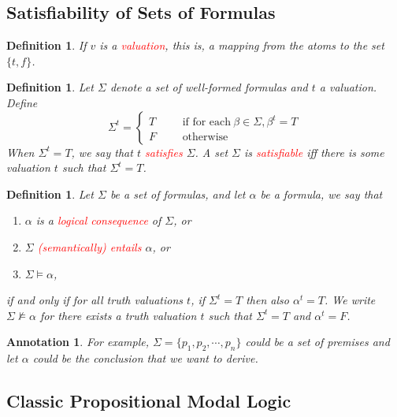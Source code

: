\documentclass{article}
\theoremstyle{plain}
\newtheorem{definition}[theorem]{Definition}
\newtheorem{annotation}[theorem]{Annotation}
\theoremstyle{nonumberplain}
\newcommand{\redt}[1]{\textcolor{red}{#1}}
\begin{document}
\newpage
\subsection{Satisfiability of Sets of Formulas}

\begin{definition}
\rm If $v$ is a \redt{valuation}, this is, a mapping from the atoms to the set $\{t,f\}$.   
\end{definition}


\begin{definition}
\rm \cite{cs245-sat} Let $\Sigma$ denote a set of well-formed formulas and $t$ a valuation. Define 
$$
\Sigma^t = \left\{
\begin{aligned}
T &&& \text{if for each}~\beta \in \Sigma, \beta^t = T \\
F &&& \text{otherwise}
\end{aligned}\right.
$$
When $\Sigma^t = T$, we say that $t$ \redt{satisfies} $\Sigma$. A set $\Sigma$ is \redt{satisfiable} iff there is some valuation $t$ such that $\Sigma^t = T$. 
\end{definition}


\begin{definition}
\rm Let $\Sigma$ be a set of formulas, and let $\alpha$ be a formula, we say that 
\begin{enumerate}
	\item $\alpha$ is a \redt{logical consequence} of $\Sigma$, or
	\item $\Sigma$ \redt{(semantically) entails} $\alpha$, or
	\item $\Sigma \models \alpha$,
\end{enumerate}
if and only if for all truth valuations $t$, if $\Sigma^t = T$ then also $\alpha^t = T$. We write $\Sigma \nvDash \alpha$ for there exists a truth valuation $t$ such that $\Sigma^t = T$ and $\alpha^t = F$. 
\end{definition}

\begin{annotation}
\rm For example, $\Sigma = \{p_1,p_2,\cdots,p_n\}$ could be a set of premises and let $\alpha$ could be the conclusion that we want to derive. 
\end{annotation}

\newpage
\subsection{Classic Propositional Modal Logic}
\end{document}
